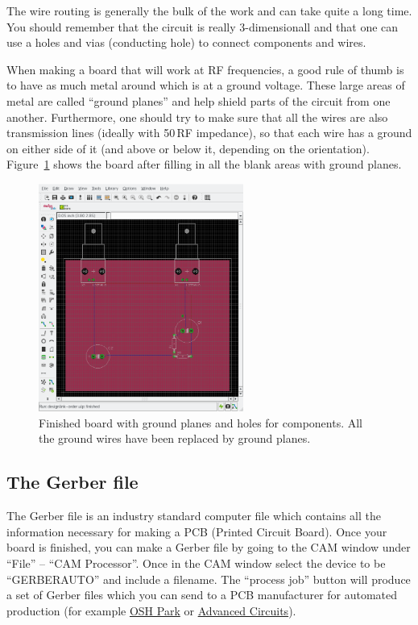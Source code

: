 \documentclass{article}
\begin{document}
The wire routing is generally the bulk of the work and can take quite a long time. You should remember that the circuit is really 3-dimensionall and that one can use a holes and vias (conducting hole) to connect components and wires.

When making a board that will work at RF frequencies, a good rule of thumb is to have as much metal around which is at a ground voltage. These large areas of metal are called ``ground planes'' and help shield parts of the circuit from one another. Furthermore, one should try to make sure that all the wires are also transmission lines (ideally with 50\,\Ohm RF impedance), so that each wire has a ground on either side of it (and above or below it, depending on the orientation).  Figure~\ref{fig:eagle:board_complete} shows the board after filling in all the blank areas with ground planes.

\begin{figure}
\begin{center}
\includegraphics[width=0.6\textwidth]{pics/eagle_board_complete}
\end{center}
\caption{Finished board with ground planes and holes for components. All the ground wires have been replaced by ground planes.}
\label{fig:eagle:board_complete}
\end{figure}

\subsection{The Gerber file}
The Gerber file is an industry standard computer file which contains all the information necessary for making a PCB (Printed Circuit Board). Once your board is finished, you can make a Gerber file by going to the CAM window under ``File'' -- ``CAM Processor''. Once in the CAM window select the device to be ``GERBERAUTO'' and include a filename. The ``process job'' button will produce a set of Gerber files which you can send to a PCB manufacturer for automated production (for example \href{http://oshpark.com/}{OSH Park} or \href{http://www.4pcb.com/}{Advanced Circuits}).
\end{document}
